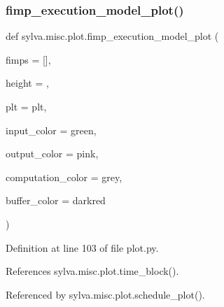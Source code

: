 \mbox{\label{namespacesylva_1_1misc_1_1plot_a2e27375ca68228e819017903e39e39d9}} 
\subsubsection{\texorpdfstring{fimp\+\_\+execution\+\_\+model\+\_\+plot()}{fimp\_execution\_model\_plot()}}
{\footnotesize\ttfamily def sylva.\+misc.\+plot.\+fimp\+\_\+execution\+\_\+model\+\_\+plot (\begin{DoxyParamCaption}\item[{}]{fimps = {\ttfamily \mbox{[}\mbox{]}},  }\item[{}]{height = {},  }\item[{}]{plt = {\ttfamily plt},  }\item[{}]{input\+\_\+color = {\ttfamily \textquotesingle{}green\textquotesingle{}},  }\item[{}]{output\+\_\+color = {\ttfamily \textquotesingle{}pink\textquotesingle{}},  }\item[{}]{computation\+\_\+color = {\ttfamily \textquotesingle{}grey\textquotesingle{}},  }\item[{}]{buffer\+\_\+color = {\ttfamily \textquotesingle{}darkred\textquotesingle{}} }\end{DoxyParamCaption})}



Definition at line 103 of file plot.\+py.



References sylva.\+misc.\+plot.\+time\+\_\+block().



Referenced by sylva.\+misc.\+plot.\+schedule\+\_\+plot().


